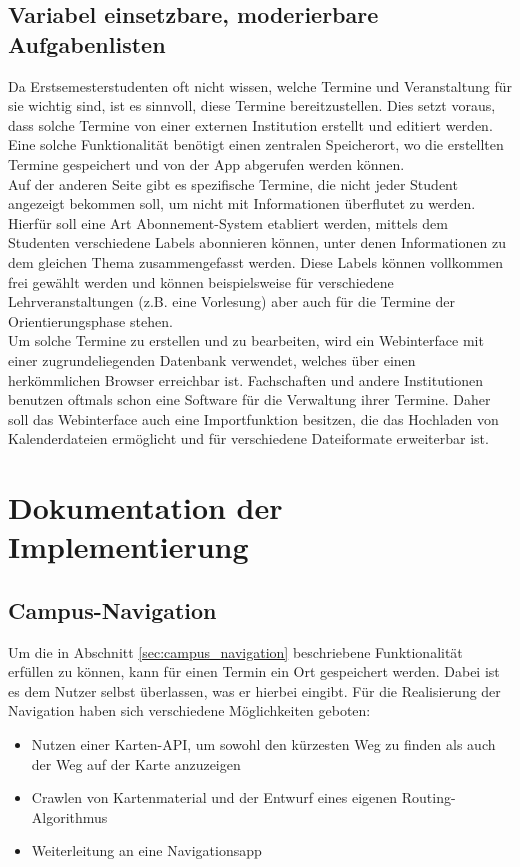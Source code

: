 \documentclass[noindent]{tudreport}
\begin{document}
		\section{Variabel einsetzbare, moderierbare Aufgabenlisten}\label{sec:todo_list}
			Da Erstsemesterstudenten oft nicht wissen, welche Termine und Veranstaltung für sie wichtig sind, ist es sinnvoll, diese Termine bereitzustellen. Dies setzt voraus, dass solche Termine von einer externen Institution erstellt und editiert werden. Eine solche Funktionalität benötigt einen zentralen Speicherort, wo die erstellten Termine gespeichert und von der App abgerufen werden können.\\
			Auf der anderen Seite gibt es spezifische Termine, die nicht jeder Student angezeigt bekommen soll, um nicht mit Informationen überflutet zu werden. Hierfür soll eine Art Abonnement-System etabliert werden, mittels dem Studenten verschiedene Labels abonnieren können, unter denen Informationen zu dem gleichen Thema zusammengefasst werden. Diese Labels können vollkommen frei gewählt werden und können beispielsweise für verschiedene Lehrveranstaltungen (z.B. eine Vorlesung) aber auch für die Termine der Orientierungsphase stehen.\\
			Um solche Termine zu erstellen und zu bearbeiten, wird ein Webinterface mit einer zugrundeliegenden Datenbank verwendet, welches über einen herkömmlichen Browser erreichbar ist. Fachschaften und andere Institutionen benutzen oftmals schon eine Software für die Verwaltung ihrer Termine. Daher soll das Webinterface auch eine Importfunktion besitzen, die das Hochladen von Kalenderdateien ermöglicht und für verschiedene Dateiformate erweiterbar ist.
		
	\chapter{Dokumentation der Implementierung}\label{chap:documentation}
		\section{Campus-Navigation}
			Um die in Abschnitt \ref{sec:campus_navigation} beschriebene Funktionalität erfüllen zu können, kann für einen Termin ein Ort gespeichert werden. Dabei ist es dem Nutzer selbst überlassen, was er hierbei eingibt. Für die Realisierung der Navigation haben sich verschiedene Möglichkeiten geboten:
			\begin{itemize}
			\item Nutzen einer Karten-API, um sowohl den kürzesten Weg zu finden als auch der Weg auf der Karte anzuzeigen
			
			\item Crawlen von Kartenmaterial und der Entwurf eines eigenen Routing-Algorithmus
			
			\item Weiterleitung an eine Navigationsapp
			\end{itemize}
			
\end{document}
